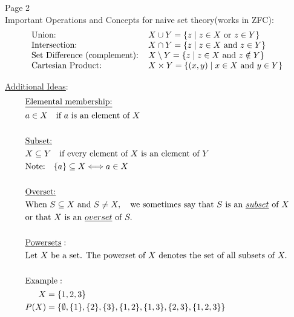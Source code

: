 \documentclass{article}
\begin{document}
\begin{flushleft}
    Page 2 \\
    Important Operations and Concepts for naive set theory(works in ZFC):
    \begin{align*}
        \begin{array}{@{}l@{\,}l@{}}
        \text{Union:} &\quad X \cup Y = \{z \mid z \in X \text{ or } z \in Y\} \\
        \text{Intersection:} &\quad X \cap Y = \{z \mid z \in X \text{ and } z \in Y\} \\
        \text{Set Difference (complement):} &\quad X \setminus Y = \{z \mid z \in X \text{ and } z \notin Y\} \\
        \text{Cartesian Product:} &\quad X \times Y = \{(x,y) \mid x \in X \text{ and } y \in Y\}
        \end{array}
        \end{align*}
        
        \underline{Additional Ideas}: \\
        
        \begin{align*}
        &\underline{\text{Elemental membership:}} \\
        &a \in X \quad \text{if } a \text{ is an element of } X \\
        &\vspace*{2em} \\
        &\underline{\text{Subset:}} \\
        &X \subseteq Y \quad \text{if every element of } X \text{ is an element of } Y \\
        &\text{Note:} \quad \{a\} \subseteq X \Longleftrightarrow a \in X \\
        &\vspace*{2em} \\
        &\underline{\text{Overset:}} \\
        &\text{When } S \subseteq X \text{ and } S \neq X, \quad \text{we sometimes say that } S \text{ is an } \underline{subset} \text{ of } X \\
        &\text{or that } X \text{ is an } \underline{overset} \text{ of } S. \\
        &\vspace*{2em} \\
        &\underline{\text{Powersets}}: \\
        &\text{Let } X \text{ be a set. The powerset of } X \text{ denotes the set of all subsets of } X. \\
        &\vspace*{1em} \\
        &\text{Example}: \\
        &\begin{aligned}
        X &= \{1,2,3\} \\
        P(X) &= \{\emptyset, \{1\}, \{2\}, \{3\}, \{1,2\}, \{1,3\}, \{2,3\}, \{1,2,3\}\}
        \end{aligned}
        \end{align*}
\end{flushleft}
\end{document}
